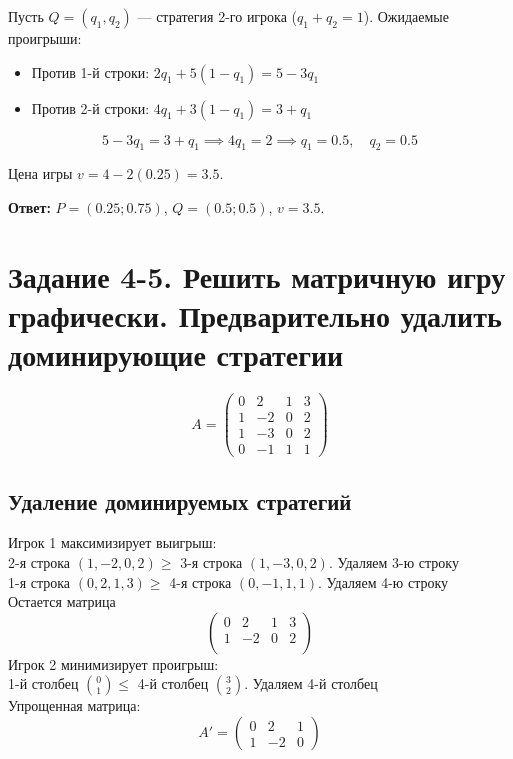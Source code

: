 \documentclass[a4paper,12pt]{article}
\begin{document}
Пусть $Q = (q_1, q_2)$ — стратегия 2-го игрока ($q_1 + q_2 = 1$). Ожидаемые проигрыши:
\begin{itemize}
    \item Против 1-й строки: $2q_1 + 5(1 - q_1) = 5 - 3q_1$
    \item Против 2-й строки: $4q_1 + 3(1 - q_1) = 3 + q_1$
\end{itemize}
$$5 - 3q_1 = 3 + q_1 \implies 4q_1 = 2 \implies q_1 = 0.5, \quad q_2 = 0.5$$

Цена игры $v = 4 - 2(0.25) = 3.5$.

\textbf{Ответ:} $P = (0.25; 0.75)$, $Q = (0.5; 0.5)$, $v = 3.5$.


\newpage


\section*{Задание 4-5. Решить матричную игру графически. Предварительно удалить доминирующие стратегии}
$$A = \begin{pmatrix} 0 & 2 & 1 & 3 \\ 1 & -2 & 0 & 2 \\ 1 & -3 & 0 & 2 \\ 0 & -1 & 1 & 1 \end{pmatrix}$$

\subsection*{Удаление доминируемых стратегий}
Игрок 1 максимизирует выигрыш: \\
2-я строка $(1, -2, 0, 2) \ge$ 3-я строка $(1, -3, 0, 2)$. Удаляем 3-ю строку \\
1-я строка $(0, 2, 1, 3) \ge$ 4-я строка $(0, -1, 1, 1)$. Удаляем 4-ю строку \\
Остается матрица \\
$$\begin{pmatrix} 0 & 2 & 1 & 3 \\ 1 & -2 & 0 & 2 \\ \end{pmatrix}$$
Игрок 2 минимизирует проигрыш: \\
1-й столбец $\binom{0}{1} \le$ 4-й столбец $\binom{3}{2}$. Удаляем 4-й столбец \\
Упрощенная матрица:\\
$$A' = \begin{pmatrix} 0 & 2 & 1 \\ 1 & -2 & 0 \end{pmatrix}$$
\end{document}
